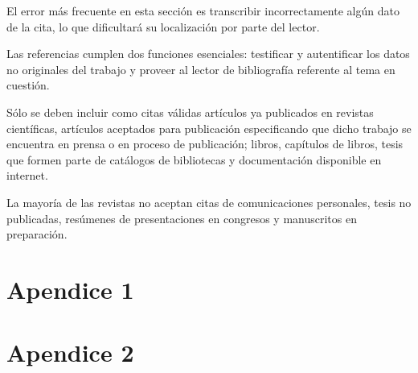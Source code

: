 \documentclass[%
 reprint,
groupedaddress,
unsortedaddress,
 amsmath,amssymb,
 aps,
superscriptaddress
]{revtex4-2}
\begin{document}
El error más frecuente en esta sección es transcribir incorrectamente algún dato de la 
cita, lo que dificultará su localización por parte del lector.

Las referencias cumplen dos funciones esenciales: testificar y autentificar los datos no 
originales del trabajo y proveer al lector de bibliografía referente al tema en cuestión.

Sólo se deben incluir como citas válidas artículos ya publicados en revistas científicas, 
artículos aceptados para publicación especificando que dicho trabajo se encuentra en 
prensa o en proceso de publicación; libros, capítulos de libros, tesis que formen parte 
de catálogos de bibliotecas y documentación disponible en internet.

La mayoría de las revistas no aceptan citas de comunicaciones personales, tesis no 
publicadas, resúmenes de presentaciones en congresos y manuscritos en preparación.



\appendix
\section*{Apendice 1}

\section*{Apendice 2}
\end{document}
